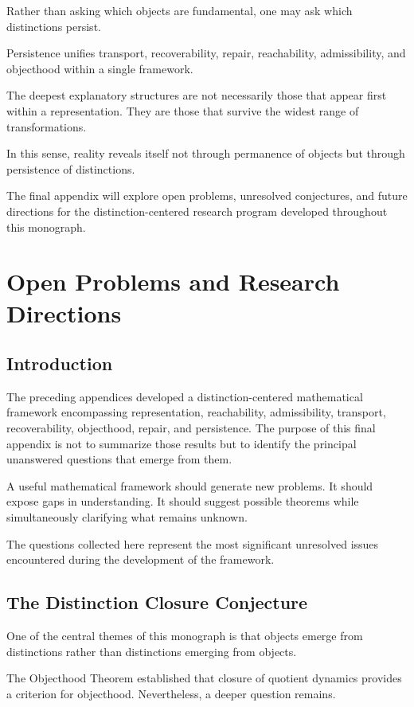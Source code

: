 \documentclass[11pt,oneside,openany]{book}
\begin{document}
Rather than asking which objects are fundamental, one may ask which distinctions persist.

Persistence unifies transport, recoverability, repair, reachability, admissibility, and objecthood within a single framework.

The deepest explanatory structures are not necessarily those that appear first within a representation. They are those that survive the widest range of transformations.

In this sense, reality reveals itself not through permanence of objects but through persistence of distinctions.

The final appendix will explore open problems, unresolved conjectures, and future directions for the distinction-centered research program developed throughout this monograph.

\chapter{Open Problems and Research Directions}

\section{Introduction}

The preceding appendices developed a distinction-centered mathematical framework encompassing representation, reachability, admissibility, transport, recoverability, objecthood, repair, and persistence. The purpose of this final appendix is not to summarize those results but to identify the principal unanswered questions that emerge from them.

A useful mathematical framework should generate new problems. It should expose gaps in understanding. It should suggest possible theorems while simultaneously clarifying what remains unknown.

The questions collected here represent the most significant unresolved issues encountered during the development of the framework.

\section{The Distinction Closure Conjecture}

One of the central themes of this monograph is that objects emerge from distinctions rather than distinctions emerging from objects.

The Objecthood Theorem established that closure of quotient dynamics provides a criterion for objecthood. Nevertheless, a deeper question remains.
\end{document}
